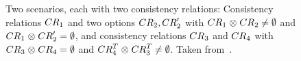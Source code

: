 \begin{figure}
    \centering
    \begin{subfigure}{\textwidth}
        \centering
        
    \end{subfigure}

    \vspace{1em}
    \begin{subfigure}{\textwidth}
        \centering
        
    \end{subfigure}
    \caption[Examples for consistency relation concatenation]{Two scenarios, each with two consistency relations: 
    Consistency relations $\consistencyrelation{CR}{1}$ and two options $\consistencyrelation{CR}{2}, \consistencyrelation{CR}{2}'$ with $\consistencyrelation{CR}{1} \concat \consistencyrelation{CR}{2} \neq \emptyset$ and $\consistencyrelation{CR}{1} \concat \consistencyrelation{CR}{2}' = \emptyset$, and consistency relations $\consistencyrelation{CR}{3}$ and $\consistencyrelation{CR}{4}$ with $\consistencyrelation{CR}{3} \concat \consistencyrelation{CR}{4} = \emptyset$ and $\consistencyrelation{CR}{4}^T \concat \consistencyrelation{CR}{3}^T \neq \emptyset$. Taken from~.}
    \label{fig:compatibility:concatenation_example}
\end{figure}

